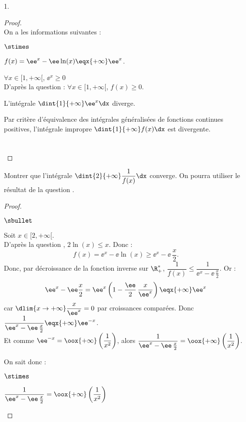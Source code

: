 \documentclass[11pt]{article}%
\begin{document}
\begin{noliste}{1.}
  \begin{proof}~\\
    On a les informations suivantes :
    \begin{noliste}{$\stimes$}
    \item $f(x)=\ee^x - \ee\ln(x) \eqx{+\infty} \ee^x$.
    \item $\forall x \in[1,+\infty[$, $\ee^x\geq 0$\\
      D'après la question  : $\forall x\in[1,+\infty[$,
      $f(x)\geq 0$.
    \item L'intégrale $\dint{1}{+\infty} \ee^x\dx$ diverge.
    \end{noliste}
    Par critère d'équivalence des intégrales généralisées de fonctions
    continues positives, l'intégrale impropre
    $\dint{1}{+\infty}f(x)\dx$ est divergente.~\\[-.4cm] %
    ~\\[-1cm]
    ~\\[-1.4cm]
\end{proof}


\item Montrer que l'intégrale $\dint{2}{+\infty} \dfrac{1}{f(x)}\dx$
  converge.  On pourra utiliser le résultat de la question
  .

\begin{proof}~
\begin{noliste}{$\sbullet$}
\item Soit $x\in[2,+\infty[$.\\
D'après la question , $2\ln(x)\leq x$. Donc :
\[
f(x)=\ee^x - \ee \ln(x)\geq \ee^x - \ee \, \frac{x}{2}.
\]
Donc, par décroissance de la fonction inverse sur $\R_+^*$, 
$\dfrac{1}{f(x)}\leq \dfrac{1}{\ee^x-\ee \, \frac{x}{2}}$.
Or :
\[
\ee^x - \ee\frac{x}{2} = \ee^x \left(1 - 
\frac{\ee}{2} \, \frac{x}{\ee^x}\right) \eqx{+\infty} \ee^x
\]
car $\dlim{x\to +\infty} \dfrac{x}{\ee^x}=0$ par croissances comparées. 
Donc
$\dfrac{1}{\ee^x-\ee \, \frac{x}{2}} \eqx{+\infty} \ee^{-x}$.\\[.2cm]
Et comme 
$\ee^{-x}= \oox{+\infty}\left(\dfrac{1}{x^2}\right)$, alors
$\dfrac{1}{\ee^x-\ee \, \frac{x}{2}} = \oox{+\infty} 
\left(\dfrac{1}{x^2}\right)$.

\item On sait donc :
\begin{noliste}{$\stimes$}
  \item $\dfrac{1}{\ee^x-\ee \, \frac{x}{2}} = \oox{+\infty} 
  \left(\dfrac{1}{x^2}\right)$
  

\end{noliste}
\end{noliste}
\end{proof}
\end{noliste}
\end{document}
